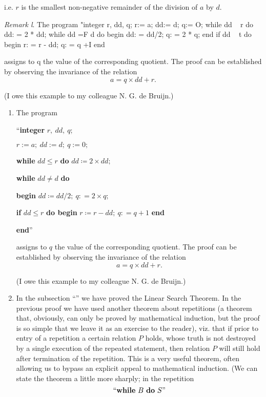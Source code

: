 \noindent
i.e. $r$ is the smallest non-negative remainder of the division of $a$ by $d$.

\textit{Remark l}. The program
"integer r, dd, q;
r:= a; dd:= d; q:= O;
while dd ~ r do dd: = 2 * dd;
while dd =F d do
begin dd: = dd/2; q: = 2 * q;
end if dd ~ t do begin r: = r - dd; q: = q +I end

assigns to q the value of the corresponding quotient. The proof can be established by observing the invariance of the relation
$$
a= q \times dd + r.
$$

(I owe this example to my colleague N. G. de Bruijn.)

\begin{enumerate}[leftmargin=*, itemindent=3\parindent, label=\textit{Remark }\arabic*.]
	\item The program
	
	{
		\setlength{\parindent}{8em}
		``\textbf{integer} $r,\ dd,\ q;$
		
		$r:= a;\ dd:= d;\ q:= 0;$
		
		\textbf{while} $dd \leqslant r$ \textbf{do} $dd \coloneq 2 \times dd;$
		
		\textbf{while} $dd \neq d$ \textbf{do}
		
		\quad\textbf{begin} $dd \coloneq dd/2;\ q: = 2 \times q;$
		
		\quad\quad\textbf{if} $dd \leqslant r$ \textbf{do begin} $r \coloneq r - dd;\ q: = q + 1$ \textbf{end}
		
		\quad\textbf{end}''
	}
	
\noindent
assigns to $q$ the value of the corresponding quotient. The proof can be established by observing the invariance of the relation
	$$
	a= q \times dd + r.
	$$
	
	(I owe this example to my colleague N. G. de Bruijn.)

	\item In the subsection ``'' we have proved the Linear Search Theorem. In the previous proof we have used another theorem about repetitions (a theorem that, obviously, can only be proved by mathematical induction, but the proof is so simple that we leave it as an exercise to the reader), viz. that if prior to entry of a repetition a certain relation $P$ holds, whose truth is not destroyed by a single execution of the repeated statement, then relation $P$ will still hold after termination of the repetition. This is a very useful theorem, often allowing us to bypass an explicit appeal to mathematical induction. (We can state the theorem a little more sharply; in the repetition
	$$
		\text{``\textbf{while} } B \text{ \textbf{do} } S\text{''}
	$$	
	

\end{enumerate}
